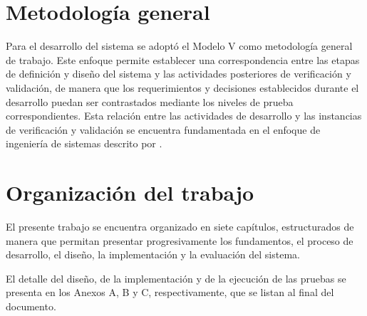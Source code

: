 \section{Metodología general}
\label{sec:metodologia-general}

Para el desarrollo del sistema se adoptó el Modelo V como metodología
general de trabajo. Este enfoque permite establecer una correspondencia
entre las etapas de definición y diseño del sistema y las actividades
posteriores de verificación y validación, de manera que los requerimientos
y decisiones establecidos durante el desarrollo puedan ser contrastados
mediante los niveles de prueba correspondientes. Esta relación entre
las actividades de desarrollo y las instancias de verificación y
validación se encuentra fundamentada en el enfoque de ingeniería de
sistemas descrito por \citet{ForsbergMooz1991}.

\section{Organización del trabajo}
\label{sec:organizacion}

El presente trabajo se encuentra organizado en siete capítulos, estructurados
de manera que permitan presentar progresivamente los fundamentos, el proceso
de desarrollo, el diseño, la implementación y la evaluación del sistema.

\begin{nuevotexto}
El detalle del diseño, de la implementación y de la ejecución de las pruebas se presenta en los Anexos A, B y C, respectivamente, que se listan al final del documento.
\end{nuevotexto}

